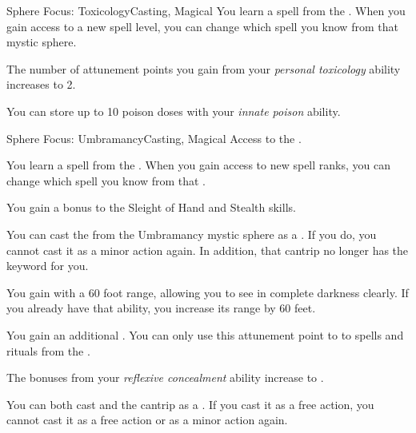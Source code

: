 \begin{feat}{Sphere Focus: Toxicology}{Casting, Magical}
         You learn a spell from the  .
        When you gain access to a new spell level, you can change which spell you know from that mystic sphere.

         The number of attunement points you gain from your \textit{personal toxicology} ability increases to 2.

         You can store up to 10 poison doses with your \textit{innate poison} ability.
    \end{feat}

    \begin{feat}{Sphere Focus: Umbramancy}{Casting, Magical}
        \featpre Access to the  .

         You learn a spell from the  .
        When you gain access to new spell ranks, you can change which spell you know from that .

         You gain a  bonus to the Sleight of Hand and Stealth skills.

         You can cast the   from the Umbramancy mystic sphere as a .
        If you do, you  cannot cast it as a minor action again.
        In addition, that cantrip no longer has the  keyword for you.

         You gain  with a 60 foot range, allowing you to see in complete darkness clearly.
        If you already have that ability, you increase its range by 60 feet.

         You gain an additional .
        You can only use this attunement point to  to spells and rituals from the  .

         The bonuses from your \textit{reflexive concealment} ability increase to .

         You can both cast and  the  cantrip as a .
        If you cast it as a free action, you  cannot cast it as a free action or as a minor action again.


\end{feat}
